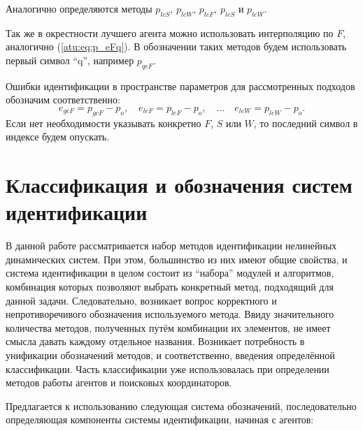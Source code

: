 Аналогично определяются методы
$p_{lcS}$,
$p_{lcW}$,
$p_{leF}$,
$p_{leS}$ и
$p_{leW}$.

Так же в окрестности лучшего агента можно использовать
интерполяцию по $F$, аналогично
(\ref{atu:eq:p_eFq}). В обозначении таких методов будем использовать
первый символ ``q'', например $p_{qeF}$.


Ошибки идентификации в пространстве параметров
для рассмотренных подходов обозначим соответственно:
%
\begin{equation}
  e_{gcF} = p_{gcF} - p_o,
  \quad
  e_{leF} = p_{leF} - p_o,
  \quad
  \ldots
  \quad
  e_{leW} = p_{leW} - p_o.
  \label{atu:eq:e_xx}
\end{equation}
%
Если нет необходимости указывать конкретно $F$, $S$ или $W$,
то последний символ в индексе будем опускать.







\section{Классификация и обозначения систем идентификации}  %
\label{atu:id_classification}

В данной работе рассматривается набор методов идентификации нелинейных динамических
систем. При этом, большинство из них имеют общие свойства, и система идентификации в  целом
состоит из ``набора'' модулей и алгоритмов, комбинация которых
позволяют выбрать конкретный метод, подходящий для данной задачи.
Следовательно, возникает вопрос корректного и непротиворечивого обозначения
используемого метода. Ввиду значительного количества методов, полученных
путём комбинации их элементов, не имеет смысла давать каждому
отдельное названия. Возникает потребность в унификации обозначений
методов, и соответственно, введения определённой классификации.
Часть классификации уже использовалась при
определении методов работы агентов и поисковых координаторов.

Предлагается к использованию следующая система обозначений,
последовательно определяющая компоненты системы идентификации, начиная с агентов:

